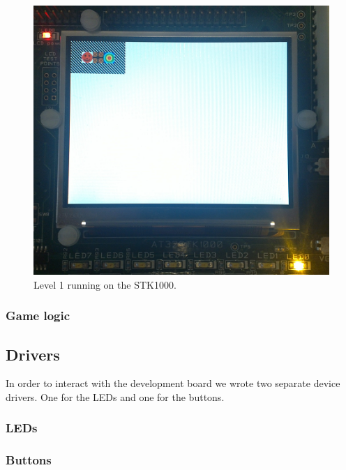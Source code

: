 \documentclass[a4paper,11pt]{article}
\begin{document}
\begin{figure}[H]
\centering
\includegraphics[scale=0.5]{images/level1.png}
\caption{Level 1 running on the STK1000.}
\label{fig:level1}
\end{figure}

\subsubsection{Game logic}

\subsection{Drivers}
In order to interact with the development board we wrote two separate device drivers. One for the LEDs and one for the buttons. 
\subsubsection{LEDs}

\subsubsection{Buttons}
\end{document}
